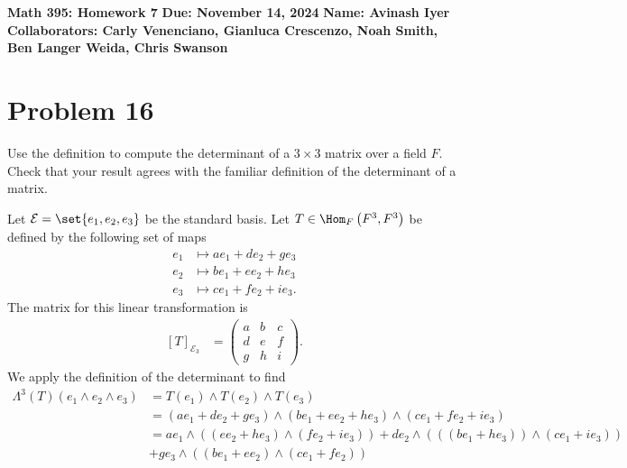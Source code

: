 \documentclass[12pt]{mypackage}
\begin{document}
\RaggedRight
\begin{center}
  \textbf{Math 395: Homework 7}\break
  \textbf{Due: November 14, 2024}\break
  \textbf{Name: Avinash Iyer}\break
  \textbf{Collaborators: Carly Venenciano, Gianluca Crescenzo, Noah Smith, Ben Langer Weida, Chris Swanson}
\end{center}
\section{Problem 16}%
\begin{problem}
  Use the definition to compute the determinant of a $3\times 3$ matrix over a field $F$. Check that your result agrees with the familiar definition of the determinant of a matrix.
\end{problem}
\begin{solution}
  Let $\mathcal{E} = \set{e_1,e_2,e_3}$ be the standard basis. Let $T\in \Hom_{F}\left(F^3,F^3\right)$ be defined by the following set of maps
  \begin{align*}
    e_1 &\mapsto ae_1 + de_2 + ge_3\\
    e_2 &\mapsto be_1 + ee_2 + he_3\\
    e_3 &\mapsto ce_1 + fe_2 + ie_3.
  \end{align*}
  The matrix for this linear transformation is
  \begin{align*}
    \left[T\right]_{\mathcal{E}_3} &= \begin{pmatrix}a & b & c \\ d & e & f \\ g & h & i\end{pmatrix}.
  \end{align*}
  We apply the definition of the determinant to find
  {\footnotesize \begin{align*}
    \Lambda^{3}\left(T\right)\left(e_1\wedge e_2\wedge e_3\right) &= T\left(e_1\right)\wedge T\left(e_2\right)\wedge T\left(e_3\right)\\
                                                                  &= \left(ae_1 + de_2 + ge_3\right)\wedge \left(be_1 + ee_2 + he_3\right)\wedge \left(ce_1 + fe_2 + ie_3\right)\\
                                                                  &= ae_1\wedge \left(\left(ee_2 + he_3\right)\wedge \left(fe_2 + ie_3\right)\right) + de_2\wedge \left(\left(\left(be_1 + he_3\right)\right)\wedge \left(ce_1 + ie_3\right)\right)\\
                                                                  &+ ge_3\wedge \left(\left(be_1 + ee_2\right)\wedge \left(ce_1 + fe_2\right)\right)\\

\end{align*}}
\end{solution}
\end{document}
